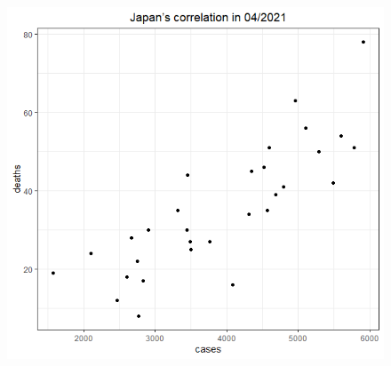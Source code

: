 \documentclass[english,10pt,table]{beamer}
\begin{document}
{\begin{figure}[H]
\begin{center}
        \includegraphics[scale = 0.2]{ix/ix.2/JPN_04_2021.png}
        

\end{center}
\end{figure}}
\end{document}
